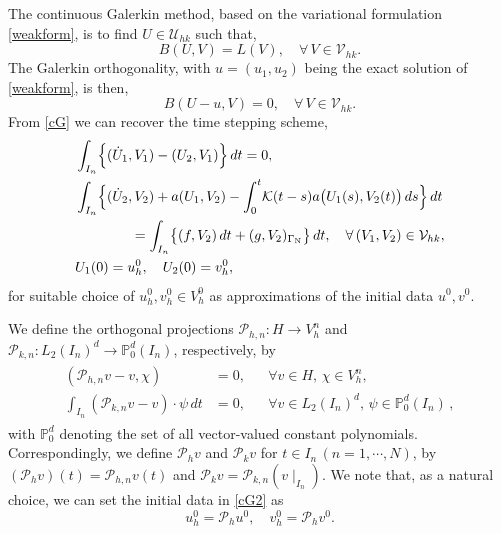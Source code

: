 \documentclass{amsart}
\numberwithin{equation}{section}
\theoremstyle{definition}
\begin{document}
The continuous Galerkin method, based on the variational formulation \eqref{weakform}, is to find $U\in{\mathcal U}_{hk}$ such that,
\begin{equation}   \label{cG}
  B(U,V)=L(V),\quad \forall\, V\in {\mathcal V}_{hk}.
\end{equation}
The Galerkin orthogonality, with $u=(u_1,u_2)$ being the exact solution
of \eqref{weakform}, is then,
\begin{equation}   \label{Galerkinorthogonality}
  B(U-u,V)=0,\quad \forall\, V\in {\mathcal V}_{hk}.
\end{equation}
From \eqref{cG} we can recover the time stepping scheme,
\begin{equation}   \label{cG2}
  \begin{split}
    &\int_{I_n} \!\Big\{(\dot{U}_1,V_1)-(U_2,V_1) \Big\}\,dt=0,\\
    &\int_{I_n}\!\Big\{(\dot{U}_2,V_2)+a(U_1,V_2)
       -\int_0^t \! {\mathcal K}(t-s)a\big(U_1(s),V_2(t)\big)\,ds\Big\}\,dt\\
    &\qquad\qquad
      =\int_{I_n}\!
      \big\{(f,V_2)\,dt+(g,V_2)_{\Gamma_{\text N}}\big\}\, dt ,
      \quad\forall\, (V_1,V_2)\in {\mathcal V}_{hk},\\
    &U_1(0)=u_h^0,\quad U_2(0)=v_h^0,
  \end{split}
\end{equation}
for suitable choice of $u_h^0,v_h^0 \in V_h^0$ as approximations of
the initial data $u^0,v^0$. 

We define the orthogonal projections 
${\mathcal P}_{h,n}:H\to V_h^n$ and ${\mathcal P}_{k,n}:L_2(I_n)^d\to{\mathbb P}^d_0(I_n)$,
respectively, by
\begin{align}  \label{projections}
  \begin{aligned}
    ({\mathcal P}_{h,n}v-v,\chi)&=0,&&\forall v\in H,\,
      \chi\in V_h^n,\\
    \int_{I_n}\!\!({\mathcal P}_{k,n}v-v)\cdot \psi\, dt&=0,&&
       \forall  v\in L_2(I_n)^d, \,\psi\in {\mathbb P}^d_0(I_n)\,,
  \end{aligned}
\end{align}
with ${\mathbb P}_0^d$ denoting the set of all vector-valued constant
polynomials. Correspondingly, we define ${\mathcal P}_hv$
and ${\mathcal P}_kv$ for
$t\!\in\! I_n\,(n=1,\cdots,N)$, by
$({\mathcal P}_hv)(t)={\mathcal P}_{h,n}v(t)$ and
${\mathcal P}_kv={\mathcal P}_{k,n}(v\!\!\mid_{I_n})$.
We note that, as a natural choice, we can set the initial data in \eqref{cG2} as
\begin{equation}   \label{initialdata}
  u_h^0={\mathcal P}_h u^0,\quad v_h^0={\mathcal P}_h v^0.
\end{equation}
\end{document}
